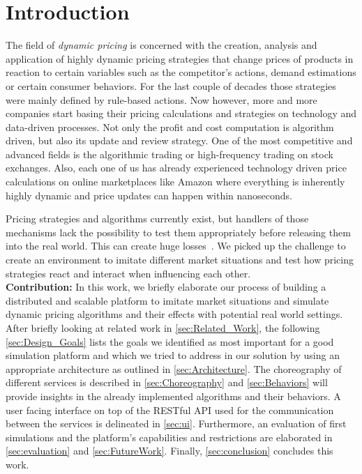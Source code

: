 %
\section{Introduction}
\label{sec:Introduction}
%
The field of \emph{dynamic pricing} is concerned with the creation, analysis and application of highly dynamic pricing strategies that change prices of products in reaction to certain variables such as the competitor's actions, demand estimations or certain consumer behaviors.
For the last couple of decades those strategies were mainly defined by rule-based actions. Now however, more and more companies start basing their pricing calculations and strategies on technology and data-driven processes. Not only the profit and cost computation is algorithm driven, but also its update and review strategy.
One of the most competitive and advanced fields is the algorithmic trading or high-frequency trading on stock exchanges. Also, each one of us has already experienced technology driven price calculations on online marketplaces like Amazon where everything is inherently highly dynamic and price updates can happen within nanoseconds.

Pricing strategies and algorithms currently exist, but handlers of those mechanisms lack the possibility to test them appropriately before releasing them into the real world. This can create huge losses~\citep{uflacker2016ertragsmanagement,schlosser2016optimal,schlosser2016stochastic,schlosser2016survive}. We picked up the challenge to create an environment to imitate different market situations and test how pricing strategies react and interact when influencing each other. \\

\textbf{Contribution:} In this work, we briefly elaborate our process of building a distributed and scalable platform to imitate market situations and simulate dynamic pricing algorithms and their effects with potential real world settings.
After briefly looking at related work in \cref{sec:Related_Work}, the following \cref{sec:Design_Goals} lists the goals we identified as most important for a good simulation platform and which we tried to address in our solution by using an appropriate architecture as outlined in \cref{sec:Architecture}.
The choreography of different services is described in \cref{sec:Choreography} and \cref{sec:Behaviors} will provide insights in the already implemented algorithms and their behaviors.
A user facing interface on top of the RESTful API used for the communication between the services is delineated in \cref{sec:ui}. Furthermore, an evaluation of first simulations and the platform's capabilities and restrictions are elaborated in \cref{sec:evaluation} and \cref{sec:FutureWork}. Finally, \cref{sec:conclusion} concludes this work.


